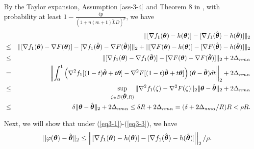 \documentclass[12pt,a4paper]{article}%
\newcommand{\be}{\begin{equation}}
\newcommand{\ee}{\end{equation}}
\newcommand\bes{\begin{eqnarray}}
\newcommand\ees{\end{eqnarray}}
\newcommand \vc[1]{{\mbox{\boldmath${#1}$}}}
\newcommand \vtheta{\vc \theta}
\numberwithin{equation}{section}
\newcommand{\sbr}[1]{\left(#1\right)}        %
\begin{document}
By the Taylor expansion, Assumption \ref{ass-3-4} and Theorem 8 in \cite{YinChenRB2018}, with probability at least $1-\frac{4p}{(1+n(m+1)\tilde{L}D)^p}$, we have
\bes\label{eq3-3}
&&\|[\nabla f_1(\vtheta)- h(\vtheta)]-[\nabla f_1(\hat{\vtheta})- h(\hat{\vtheta})]\|_2\nonumber\\
&\leq&\|[\nabla f_1(\vtheta)-\nabla F(\vtheta)]-[\nabla f_1(\hat{\vtheta})-\nabla F(\hat{\vtheta})]\|_2+\|[\nabla F(\vtheta)-h(\vtheta)]-[\nabla F(\hat{\vtheta})-h(\hat{\vtheta})]\|_2\nonumber\\
&\leq&\|[\nabla f_1(\vtheta)-\nabla f_1(\hat{\vtheta})]-[\nabla F(\vtheta)-\nabla F(\hat{\vtheta})]\|_2+2\Delta_{nm\alpha}\nonumber\\
&=&\left\|\int_0^1\sbr{\nabla^2f_1[(1-t)\hat{\vtheta}+t\vtheta]-\nabla^2F[(1-t)\hat{\vtheta}+t\vtheta]}(\vtheta-\hat{\vtheta})dt\right\|_2+2\Delta_{nm\alpha}\nonumber\\
&\leq& \sup_{\zeta\in B(\hat{\vtheta},R)}\|\nabla^2f_1(\zeta)-\nabla^2F(\zeta)\|_2\|\vtheta-\hat{\vtheta}\|_2+2\Delta_{nm\alpha}\nonumber\\
&\leq& \delta\|\vtheta-\hat{\vtheta}\|_2+2\Delta_{nm\alpha}\leq \delta R+2\Delta_{nm\alpha}=(\delta+2\Delta_{nm\alpha}/R)R<\rho R.
\ees

Next, we will show that under (\ref{eq3-1})-(\ref{eq3-3}), we have
\be\label{eq3-4}
\|\varphi(\vtheta)-\hat{\vtheta}\|_2\leq \left\|[\nabla f_1(\vtheta)- h(\vtheta)]-[\nabla f_1(\hat{\vtheta})- h(\hat{\vtheta})]\right\|_2/\rho.
\ee
\end{document}
